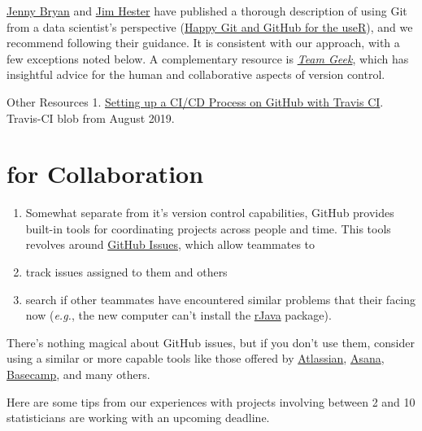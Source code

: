 \documentclass[]{book}
\begin{document}
\href{https://github.com/jennybc}{Jenny Bryan} and \href{https://github.com/jimhester}{Jim Hester} have published a thorough description of using Git from a data scientist's perspective (\href{https://happygitwithr.com/}{Happy Git and GitHub for the useR}), and we recommend following their guidance. It is consistent with our approach, with a few exceptions noted below. A complementary resource is \emph{\href{https://smile.amazon.com/dp/1449302440}{Team Geek}}, which has insightful advice for the human and collaborative aspects of version control.

Other Resources
1. \href{https://blog.travis-ci.com/2019-05-30-setting-up-a-ci-cd-process-on-github}{Setting up a CI/CD Process on GitHub with Travis CI}. Travis-CI blob from August 2019.

\hypertarget{for-collaboration}{%
\section{for Collaboration}\label{for-collaboration}}

\begin{enumerate}
\def\labelenumi{\arabic{enumi}.}
\item
  Somewhat separate from it's version control capabilities, GitHub provides built-in tools for coordinating projects across people and time. This tools revolves around \href{https://guides.github.com/features/issues/}{GitHub Issues}, which allow teammates to
\item
  track issues assigned to them and others
\item
  search if other teammates have encountered similar problems that their facing now (\emph{e.g.}, the new computer can't install the \href{https://CRAN.R-project.org/package=rJava}{rJava} package).
\end{enumerate}

There's nothing magical about GitHub issues, but if you don't use them, consider using a similar or more capable tools like those offered by \href{https://www.atlassian.com/}{Atlassian}, \href{https://asana.com/}{Asana}, \href{https://basecamp.com/}{Basecamp}, and many others.

Here are some tips from our experiences with projects involving between 2 and 10 statisticians are working with an upcoming deadline.
\end{document}
